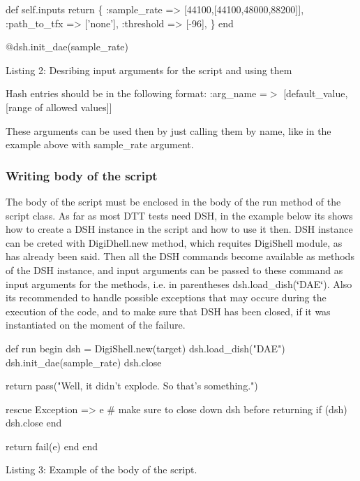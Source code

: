 \begin{DoxyCode}
def \textcolor{keyword}{self}.inputs
    \textcolor{keywordflow}{return} \{
      :sample\_rate     => [44100,[44100,48000,88200]],
      :path\_to\_tfx     => [\textcolor{stringliteral}{'none'}],
      :threshold       => [-96],
    \}
end

@dsh.init\_dae(sample\_rate)
\end{DoxyCode}
 Listing 2\+: Desribing input arguments for the script and using them

Hash entries should be in the following format\+:  \+:arg\+\_\+name =$>$ \mbox{[}default\+\_\+value, \mbox{[}range of allowed values\mbox{]}\mbox{]} 

These arguments can be used then by just calling them by name, like in the example above with {\ttfamily sample\+\_\+rate} argument.

\hypertarget{a00366_writing_body_of_the_script}{}\subsubsection{Writing body of the script}\label{a00366_writing_body_of_the_script}
 The body of the script must be enclosed in the body of the {\ttfamily run} method of the script class. As far as most D\+T\+T tests need D\+S\+H, in the example below it\textquotesingle{}s shows how to create a D\+S\+H instance in the script and how to use it then. D\+S\+H instance can be creted with {\ttfamily Digi\+Dhell.\+new} method, which requites Digi\+Shell module, as has already been said. Then all the D\+S\+H commands become available as methods of the D\+S\+H instance, and input arguments can be passed to these command as input arguments for the methods, i.\+e. in parentheses {\ttfamily dsh.\+load\+\_\+dish(\char`\"{}\+D\+A\+E\char`\"{})}. Also it\textquotesingle{}s recommended to handle possible exceptions that may occure during the execution of the code, and to make sure that D\+S\+H has been closed, if it was instantiated on the moment of the failure.


\begin{DoxyCode}
def run
   begin
      dsh = DigiShell.new(target)
      dsh.load\_dish(\textcolor{stringliteral}{"DAE"})
      dsh.init\_dae(sample\_rate)
      dsh.close

      \textcolor{keywordflow}{return} pass(\textcolor{stringliteral}{"Well, it didn't explode.  So that's something."})

   rescue Exception => e
      \textcolor{preprocessor}{# make sure to close down dsh before returning}
      \textcolor{keywordflow}{if} (dsh)
         dsh.close
      end
        
      \textcolor{keywordflow}{return} fail(e)
   end
end
\end{DoxyCode}
 Listing 3\+: Example of the body of the script.



